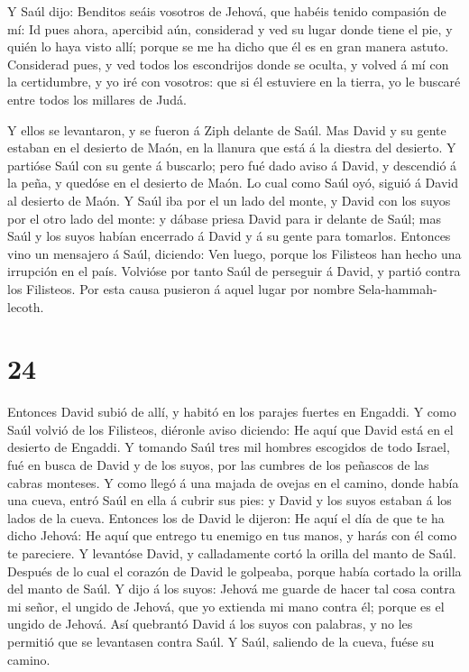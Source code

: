  Y Saúl dijo: Benditos seáis vosotros de Jehová, que habéis
tenido compasión de mí:  Id pues ahora, apercibid aún,
considerad y ved su lugar donde tiene el pie, y quién lo haya visto
allí; porque se me ha dicho que él es en gran manera astuto.
 Considerad pues, y ved todos los escondrijos donde se
oculta, y volved á mí con la certidumbre, y yo iré con vosotros: que si
él estuviere en la tierra, yo le buscaré entre todos los millares de
Judá.

 Y ellos se levantaron, y se fueron á Ziph delante de Saúl.
Mas David y su gente estaban en el desierto de Maón, en la llanura que
está á la diestra del desierto.  Y partióse Saúl con su
gente á buscarlo; pero fué dado aviso á David, y descendió á la peña, y
quedóse en el desierto de Maón. Lo cual como Saúl oyó, siguió á David al
desierto de Maón.  Y Saúl iba por el un lado del monte, y
David con los suyos por el otro lado del monte: y dábase priesa David
para ir delante de Saúl; mas Saúl y los suyos habían encerrado á David y
á su gente para tomarlos.  Entonces vino un mensajero á
Saúl, diciendo: Ven luego, porque los Filisteos han hecho una irrupción
en el país.  Volvióse por tanto Saúl de perseguir á David,
y partió contra los Filisteos. Por esta causa pusieron á aquel lugar por
nombre Sela-hammah-lecoth.


\hypertarget{section-23}{%
\section{24}\label{section-23}}

 Entonces David subió de allí, y habitó en los parajes
fuertes en Engaddi.  Y como Saúl volvió de los Filisteos,
diéronle aviso diciendo: He aquí que David está en el desierto de
Engaddi.  Y tomando Saúl tres mil hombres escogidos de todo
Israel, fué en busca de David y de los suyos, por las cumbres de los
peñascos de las cabras monteses.  Y como llegó á una majada
de ovejas en el camino, donde había una cueva, entró Saúl en ella á
cubrir sus pies: y David y los suyos estaban á los lados de la cueva.
 Entonces los de David le dijeron: He aquí el día de que te
ha dicho Jehová: He aquí que entrego tu enemigo en tus manos, y harás
con él como te pareciere. Y levantóse David, y calladamente cortó la
orilla del manto de Saúl.  Después de lo cual el corazón de
David le golpeaba, porque había cortado la orilla del manto de Saúl.
 Y dijo á los suyos: Jehová me guarde de hacer tal cosa
contra mi señor, el ungido de Jehová, que yo extienda mi mano contra él;
porque es el ungido de Jehová.  Así quebrantó David á los
suyos con palabras, y no les permitió que se levantasen contra Saúl. Y
Saúl, saliendo de la cueva, fuése su camino.

